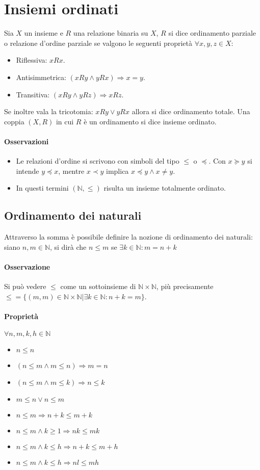 \chapter{Insiemi ordinati}
Sia $X$ un insieme e $R$ una relazione binaria su $X$, $R$ si dice ordinamento parziale o relazione d'ordine parziale se valgono le seguenti propriet\`a $\forall 
x,y,z\in X$:
\begin{itemize}
\item Riflessiva: $xRx$.
\item Antisimmetrica: $(xRy\wedge yRx)\Rightarrow x=y$.
\item Transitiva: $(xRy\wedge yRz)\Rightarrow xRz$.
\end{itemize}
Se inoltre vala la tricotomia: $xRy\lor yRx$ allora si dice ordinamento totale. Una coppia $(X, R)$ in cui $R$ \`e un ordinamento si dice insieme ordinato.
\subsubsection{Osservazioni}
\begin{itemize}
\item Le relazioni d'ordine si scrivono con simboli del tipo $\le$ o $\preceq$. Con $x\succeq y$ si intende $y\preceq x$, mentre $x\prec y$ implica $x\preceq y
\wedge x\neq y$.
\item In questi termini $(\mathbb{N}, \le)$ risulta un insieme totalmente ordinato.
\end{itemize}
\section{Ordinamento dei naturali}
Attraverso la somma \`e possibile definire la nozione di ordinamento dei naturali: siano $n,m\in\mathbb{N}$, si dir\`a che $n\le m$ se $\exists k\in
\mathbb{N}:m=n+k$
\subsubsection{Osservazione}
Si pu\`o vedere $\le$ come un sottoinsieme di $\mathbb{N}\times\mathbb{N}$, pi\`u precisamente $\le=\{(m,m)\in\mathbb{N}\times\mathbb{N}|\exists k\in
\mathbb{N}:n+k=m\}$.
\subsubsection{Propriet\`a}
$\forall n,m,k,h\in\mathbb{N}$
\begin{itemize}
\item $n\le n$
\item $(n\le m\wedge m\le n)\Rightarrow m=n$
\item $(n\le m\wedge m\le k)\Rightarrow n\le k$
\item $m\le n\lor n\le m$
\item $n\le m\Rightarrow n+k\le m+k$
\item $n\le m\wedge k\ge 1\Rightarrow nk\le mk$
\item $n\le m\wedge k\le h\Rightarrow n+k\le m+h$
\item $n\le m\wedge k\le h\Rightarrow nl\le mh$
\end{itemize}
